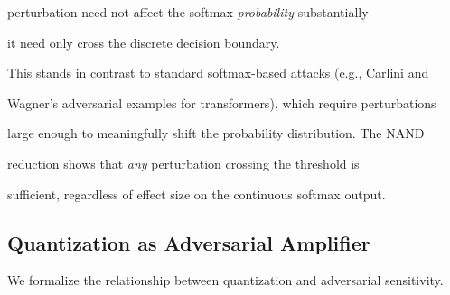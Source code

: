 perturbation need not affect the softmax \emph{probability} substantially ---






it need only cross the discrete decision boundary.













This stands in contrast to standard softmax-based attacks (e.g., Carlini and






Wagner's adversarial examples for transformers), which require perturbations






large enough to meaningfully shift the probability distribution.  The NAND






reduction shows that \emph{any} perturbation crossing the threshold is






sufficient, regardless of effect size on the continuous softmax output.













\subsection{Quantization as Adversarial Amplifier}













We formalize the relationship between quantization and adversarial sensitivity.













